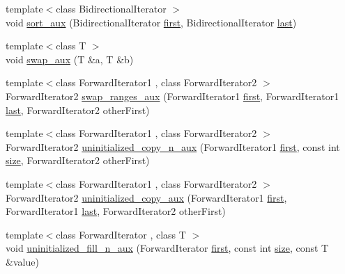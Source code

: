 \begin{DoxyCompactItemize}
\item 
{\footnotesize template$<$class Bidirectional\+Iterator $>$ }\\void \hyperlink{namespaceprism_a79f1533ec8a11842db47a4d70cdbd056}{sort\+\_\+aux} (Bidirectional\+Iterator \hyperlink{namespaceprism_ae3fb7a1926a9e8e59300cd5e370470da}{first}, Bidirectional\+Iterator \hyperlink{namespaceprism_abe4956c4e865f55ca126b7fb973b5078}{last})
\item 
{\footnotesize template$<$class T $>$ }\\void \hyperlink{namespaceprism_a6d3a7129cc6ab5d9a80301436e4d2e48}{swap\+\_\+aux} (T \&a, T \&b)
\item 
{\footnotesize template$<$class Forward\+Iterator1 , class Forward\+Iterator2 $>$ }\\Forward\+Iterator2 \hyperlink{namespaceprism_a7ca4ae3ad4c2e21d6fe48b6fae6930c3}{swap\+\_\+ranges\+\_\+aux} (Forward\+Iterator1 \hyperlink{namespaceprism_ae3fb7a1926a9e8e59300cd5e370470da}{first}, Forward\+Iterator1 \hyperlink{namespaceprism_abe4956c4e865f55ca126b7fb973b5078}{last}, Forward\+Iterator2 other\+First)
\item 
{\footnotesize template$<$class Forward\+Iterator1 , class Forward\+Iterator2 $>$ }\\Forward\+Iterator2 \hyperlink{namespaceprism_a85d1fe2d10e98f9de7aec30799f2eec0}{uninitialized\+\_\+copy\+\_\+n\+\_\+aux} (Forward\+Iterator1 \hyperlink{namespaceprism_ae3fb7a1926a9e8e59300cd5e370470da}{first}, const int \hyperlink{namespaceprism_acd3c0f96adf158a29387191d79c4d874}{size}, Forward\+Iterator2 other\+First)
\item 
{\footnotesize template$<$class Forward\+Iterator1 , class Forward\+Iterator2 $>$ }\\Forward\+Iterator2 \hyperlink{namespaceprism_a6ef07b731fbaecb8abe1ad8faabaab1e}{uninitialized\+\_\+copy\+\_\+aux} (Forward\+Iterator1 \hyperlink{namespaceprism_ae3fb7a1926a9e8e59300cd5e370470da}{first}, Forward\+Iterator1 \hyperlink{namespaceprism_abe4956c4e865f55ca126b7fb973b5078}{last}, Forward\+Iterator2 other\+First)
\item 
{\footnotesize template$<$class Forward\+Iterator , class T $>$ }\\void \hyperlink{namespaceprism_aa02596d3361c57f312168ffac621e421}{uninitialized\+\_\+fill\+\_\+n\+\_\+aux} (Forward\+Iterator \hyperlink{namespaceprism_ae3fb7a1926a9e8e59300cd5e370470da}{first}, const int \hyperlink{namespaceprism_acd3c0f96adf158a29387191d79c4d874}{size}, const T \&value)
\item 

\end{DoxyCompactItemize}
